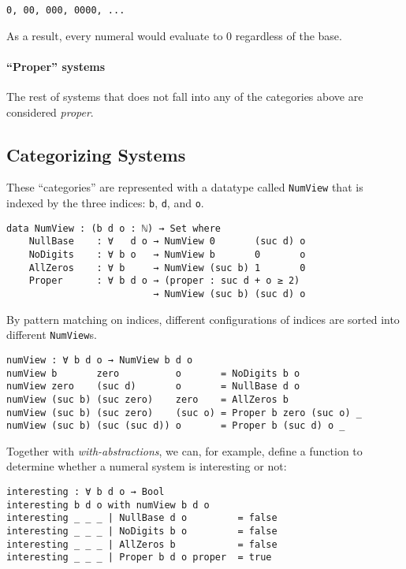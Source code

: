 \documentclass[\main/thesis.tex]{subfiles}
\begin{document}
\begin{lstlisting}
0, 00, 000, 0000, ...
\end{lstlisting}

As a result, every numeral would evaluate to $ 0 $ regardless of the base.

\paragraph{``Proper'' systems}

The rest of systems that does not fall into any of the categories above
are considered \textit{proper}.

\subsection{Categorizing Systems}

These ``categories'' are represented with a datatype called {\lstinline|NumView|}
that is indexed by the three indices: {\lstinline|b|}, {\lstinline|d|}, and {\lstinline|o|}.

\begin{lstlisting}
data NumView : (b d o : ℕ) → Set where
    NullBase    : ∀   d o → NumView 0       (suc d) o
    NoDigits    : ∀ b o   → NumView b       0       o
    AllZeros    : ∀ b     → NumView (suc b) 1       0
    Proper      : ∀ b d o → (proper : suc d + o ≥ 2)
                          → NumView (suc b) (suc d) o
\end{lstlisting}

By pattern matching on indices, different configurations of indices are sorted into
different {\lstinline|NumView|}s.

\begin{lstlisting}
numView : ∀ b d o → NumView b d o
numView b       zero          o       = NoDigits b o
numView zero    (suc d)       o       = NullBase d o
numView (suc b) (suc zero)    zero    = AllZeros b
numView (suc b) (suc zero)    (suc o) = Proper b zero (suc o) _
numView (suc b) (suc (suc d)) o       = Proper b (suc d) o _
\end{lstlisting}

Together with \textit{with-abstractions}, we can, for example, define a function
to determine whether a numeral system is interesting or not:

\begin{lstlisting}
interesting : ∀ b d o → Bool
interesting b d o with numView b d o
interesting _ _ _ | NullBase d o         = false
interesting _ _ _ | NoDigits b o         = false
interesting _ _ _ | AllZeros b           = false
interesting _ _ _ | Proper b d o proper  = true
\end{lstlisting}
\end{document}
